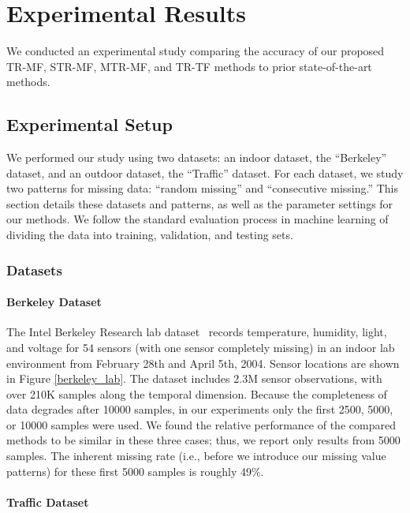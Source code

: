 \section{Experimental Results}  \label{sec:exp}

We conducted an experimental study comparing the accuracy of our proposed TR-MF, STR-MF, MTR-MF, and TR-TF methods to
prior state-of-the-art methods.

\subsection{Experimental Setup}
We performed our study using two datasets: an indoor dataset, the ``Berkeley'' dataset, and an outdoor dataset, the ``Traffic''
dataset.  For each dataset, we study two patterns for missing data: ``random missing'' and ``consecutive missing.''  This section
details these datasets and patterns, as well as the parameter settings for our methods.
We follow the standard evaluation process in machine learning of dividing the data into training, validation, and testing sets.

\subsubsection{Datasets}

\paragraph*{Berkeley Dataset}

The Intel Berkeley Research lab dataset~\cite{berkeley2004lab} records temperature, humidity, light, and voltage for 54 sensors (with one sensor completely missing) in an indoor lab environment
from February 28th and April 5th, 2004.  Sensor locations are shown in Figure \ref{berkeley_lab}.
The dataset includes 2.3M sensor observations, with over 210K samples along the temporal dimension.
Because the completeness of data degrades after 10000 samples, in our experiments only the first 2500, 5000, or 10000 samples were used.
We found the relative performance of the compared methods to be similar in these three cases; thus, we report only results from 
5000 samples.  The inherent missing rate (i.e., before we introduce our missing value patterns) for these first 5000 samples is roughly 49\%.


\paragraph*{Traffic Dataset}

